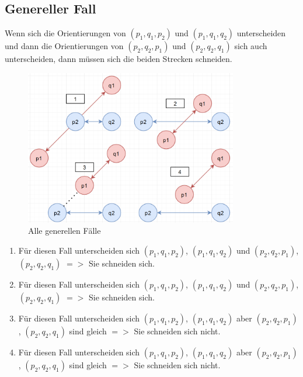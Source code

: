 \documentclass[conference]{IEEEtran}
\begin{document}
\subsection{Genereller Fall}
Wenn sich die Orientierungen von $(p_1,q_1,p_2)$ und $(p_1,q_1,q_2)$ unterscheiden und dann die Orientierungen von $(p_2,q_2,p_1)$ und $(p_2,q_2,q_1)$ sich auch unterscheiden, dann müssen sich die beiden Strecken schneiden.\\
\begin{figure}[h]
	\begin{center}
		\includegraphics[width=9.3cm]{Cases.png}
		\caption{Alle generellen Fälle}
		\label{figure_3}
	\end{center}
\end{figure}
\begin{enumerate}
	\item Für diesen Fall unterscheiden sich $(p_1,q_1,p_2)$, $(p_1,q_1,q_2)$ und $(p_2,q_2,p_1)$, $(p_2,q_2,q_1)$ $=>$ Sie schneiden sich.
	\item Für diesen Fall unterscheiden sich $(p_1,q_1,p_2)$, $(p_1,q_1,q_2)$ und $(p_2,q_2,p_1)$, $(p_2,q_2,q_1)$ $=>$ Sie schneiden sich.
	\item Für diesen Fall unterscheiden sich $(p_1,q_1,p_2)$, $(p_1,q_1,q_2)$ aber $(p_2,q_2,p_1)$, $(p_2,q_2,q_1)$ sind gleich $=>$ Sie schneiden sich nicht.
	\item Für diesen Fall unterscheiden sich $(p_1,q_1,p_2)$, $(p_1,q_1,q_2)$ aber $(p_2,q_2,p_1)$, $(p_2,q_2,q_1)$ sind gleich $=>$ Sie schneiden sich nicht.
\end{enumerate}
\end{document}
